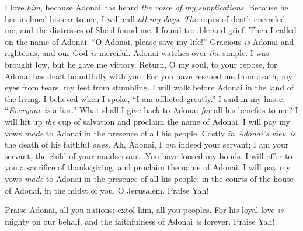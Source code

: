 \begin{biblechapter} %
 I love \textit{him}, because Adonai has heard 
\textit{the voice of my supplications}.
\verse Because he has inclined his ear to me, 
I will call \textit{all my days}.
\verse \textit{The} ropes of death encircled me, 
and the distresses of Sheol found me. 
I found trouble and grief.
\verse Then I called on the name of Adonai: 
“O Adonai, please save my life!”
\verse Gracious \textit{is} Adonai and righteous, 
and our God \textit{is} merciful.
\verse Adonai watches over \textit{the} simple. 
I was brought low, but he gave me victory.
\verse Return, O my soul, to your repose, 
for Adonai has dealt bountifully with you.
\verse For you have rescued me from death, 
my eyes from tears, my feet from stumbling.
\verse I will walk before Adonai 
in the land of the living.
\verse I believed when I spoke, 
“I am afflicted greatly.”
\verse I said in my haste, 
“\textit{Everyone} \textit{is} a liar.”
\verse What shall I give back to Adonai 
\textit{for} all his benefits to me?
\verse I will lift up \textit{the} cup of salvation 
and proclaim the name of Adonai.
\verse I will pay my vows \textit{made} to Adonai 
in the presence of all his people.
\verse Costly \textit{in Adonai’s view} \textit{is} 
the death of his faithful \textit{ones}.
\verse Ah, Adonai, I \textit{am} indeed your servant; 
I am your servant, the child of your maidservant. 
You have loosed my bonds.
\verse I will offer to you a sacrifice of thanksgiving, 
and proclaim the name of Adonai.
\verse I will pay my vows \textit{made} to Adonai 
in the presence of all his people,
\verse in the courts of the house of Adonai, 
in the midst of you, O Jerusalem. 
Praise Yah!
\end{biblechapter}

\begin{biblechapter} %
 Praise Adonai, all you nations; 
extol him, all you peoples.
\verse For his loyal love \textit{is} mighty on our behalf, 
and the faithfulness of Adonai \textit{is} forever. 
Praise Yah!
\end{biblechapter}

